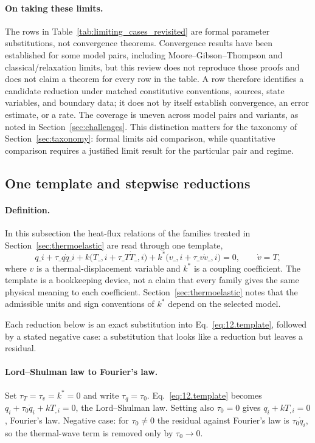 \paragraph{On taking these limits.}
The rows in Table~\ref{tab:limiting_cases_revisited} are formal parameter substitutions, not convergence theorems. Convergence results have been established for some model pairs, including Moore--Gibson--Thompson and classical/relaxation limits, but this review does not reproduce those proofs and does not claim a theorem for every row in the table. A row therefore identifies a candidate reduction under matched constitutive conventions, sources, state variables, and boundary data; it does not by itself establish convergence, an error estimate, or a rate. The coverage is uneven across model pairs and variants, as noted in Section~\ref{sec:challenges}. This distinction matters for the taxonomy of Section~\ref{sec:taxonomy}: formal limits aid comparison, while quantitative comparison requires a justified limit result for the particular pair and regime.

\subsection{One template and stepwise reductions}
\label{sec:12.3b}

\paragraph{Definition.} In this subsection the heat-flux relations of the families treated in Section~\ref{sec:thermoelastic} are read through one template,
\begin{equation}
q\_i+\tau\_q\dot q\_i+k\bigl(T\_{,i}+\tau\_T\dot T\_{,i}\bigr)+k^*\bigl(v\_{,i}+\tau\_v\dot v\_{,i}\bigr)=0,
\qquad \dot v=T,
\label{eq:12.template}
\end{equation}
where $v$ is a thermal-displacement variable and $k^*$ is a coupling coefficient. The template is a bookkeeping device, not a claim that every family gives the same physical meaning to each coefficient. Section~\ref{sec:thermoelastic} notes that the admissible units and sign conventions of $k^*$ depend on the selected model.

Each reduction below is an exact substitution into Eq.~\eqref{eq:12.template}, followed by a stated negative case: a substitution that looks like a reduction but leaves a residual.

\paragraph{Lord--Shulman law to Fourier's law.} Set $\tau_T=\tau_v=k^*=0$ and write $\tau_q=\tau_0$. Eq.~\eqref{eq:12.template} becomes $q_i+\tau_0\dot q_i+kT_{,i}=0$, the Lord--Shulman law. Setting also $\tau_0=0$ gives $q_i+kT_{,i}=0$, Fourier's law. Negative case: for $\tau_0\neq0$ the residual against Fourier's law is $\tau_0\dot q_i$, so the thermal-wave term is removed only by $\tau_0\to0$.


